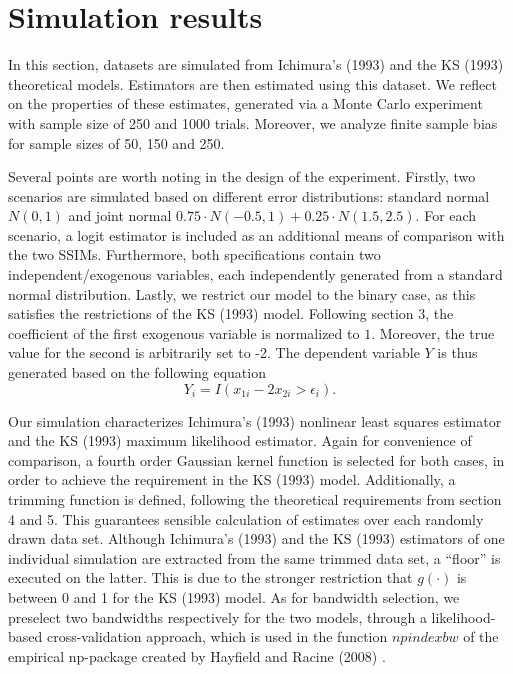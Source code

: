 \documentclass[a4paper]{article}
\begin{document}
\section{Simulation results} %
\label{sec:Simulation results}
In this section, datasets are simulated from Ichimura's (1993) \cite{[6]} and the KS (1993) \cite{[12]} theoretical models. Estimators are then estimated using this dataset. We reflect on the properties of these estimates, generated via a Monte Carlo experiment with sample size of 250 and 1000 trials. Moreover, we analyze finite sample bias for sample sizes of 50, 150 and 250.

Several points are worth noting in the design of the experiment. Firstly, two scenarios are simulated based on different error distributions: standard normal $N(0,1)$ and joint normal $0.75 \cdot N(-0.5,1)+0.25\cdot N(1.5,2.5)$. For each scenario, a logit estimator is included as an additional means of comparison with the two SSIMs. Furthermore, both specifications contain two independent/exogenous variables, each independently generated from a standard normal distribution.  Lastly, we restrict our model to the binary case, as this satisfies the restrictions of the KS (1993) \cite{[12]} model. Following section 3, the coefficient of the first exogenous variable is normalized to $1$. Moreover, the true value for the second is arbitrarily set to -2. The dependent variable $Y$ is thus generated based on the following equation
\begin{equation*}
Y_i = I(x_{1i} - 2x_{2i} > \epsilon_i).
\end{equation*}

Our simulation characterizes Ichimura's (1993) \cite{[6]} nonlinear least squares estimator and the KS (1993) \cite{[12]} maximum likelihood estimator. Again for convenience of comparison, a fourth order Gaussian kernel function is selected for both cases, in order to achieve the requirement in the KS (1993) \cite{[12]} model. Additionally, a trimming function is defined, following the theoretical requirements from section 4 and 5. This guarantees sensible calculation of estimates over each randomly drawn data set. Although Ichimura's (1993) \cite{[6]} and the KS (1993) \cite{[12]} estimators of one individual simulation are extracted from the same trimmed data set, a ``floor'' is executed on the latter. This is due to the stronger restriction that $g(\cdot)$ is between 0 and 1 for the KS (1993) \cite{[12]} model. As for bandwidth selection, we preselect two bandwidths respectively for the two models, through a likelihood-based cross-validation approach, which is used in the function $npindexbw$ of the empirical np-package created by Hayfield and Racine (2008) \cite{[28]}. 
\end{document}
